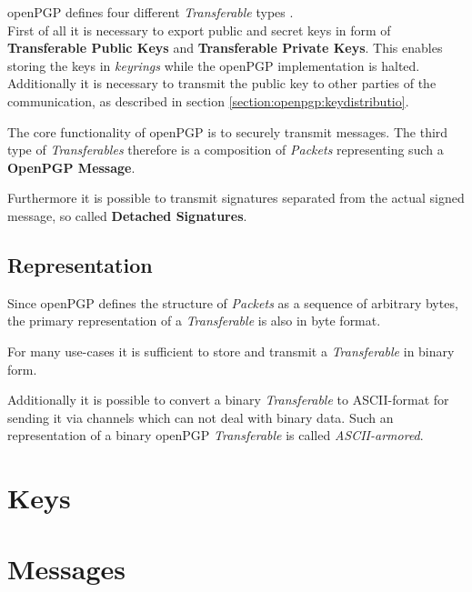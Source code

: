 openPGP defines four different \textit{Transferable} types \citep[section 11]{RFC4880}. \\

First of all it is necessary to export public and secret keys in form of \textbf{Transferable Public Keys} and \textbf{Transferable Private Keys}. This enables storing the keys in \textit{keyrings} while the openPGP implementation is halted.  Additionally it is necessary to transmit the public key to other parties of the communication, as described in section \ref{section:openpgp:keydistributio}. \\


The core functionality of openPGP is to securely transmit messages. The third type of \textit{Transferables} therefore is a composition of \textit{Packets} representing such a \textbf{OpenPGP Message}. \\


Furthermore it is possible to transmit signatures separated from the actual signed message, so called \textbf{Detached Signatures}.

\subsection{Representation}

Since openPGP defines the structure of \textit{Packets} as a sequence of arbitrary bytes, the primary representation of a \textit{Transferable} is also in byte format.

For many use-cases it is sufficient to store and transmit a \textit{Transferable} in binary form.

Additionally it is possible to convert a binary \textit{Transferable} to ASCII-format for sending it  via channels which can not deal with binary data. Such an representation of a binary openPGP \textit{Transferable} is called \textit{ASCII-armored}.


\section{Keys}

\section{Messages}

